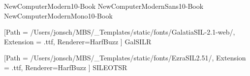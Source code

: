 \usepackage{fontspec}
\usepackage[bidi=basic]{babel}


          {NewComputerModern10-Book}
          {NewComputerModernSans10-Book}
          {NewComputerModernMono10-Book}

           [Path = /Users/jonsch/MBS/_Templates/static/fonts/GalatiaSIL-2.1-web/,
           Extension = .ttf,
           Renderer=HarfBuzz ]
          {GalSILR}

           [Path = /Users/jonsch/MBS/_Templates/static/fonts/EzraSIL2.51/,
           Extension = .ttf,
           Renderer=HarfBuzz ]
          {SILEOTSR}
